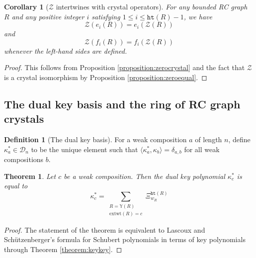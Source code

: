 \documentclass{amsart}
\newtheorem{corollary}[lemma]{Corollary}
\newtheorem{theorem}{Theorem}[section]
\theoremstyle{definition}
\newtheorem{definition}[lemma]{Definition}
\theoremstyle{remark}
\numberwithin{equation}{subsection}
\newcommand{\wof}[1]{w_{#1}}
\newcommand{\zeromap}{\mathcal{Z}}
\newcommand{\hr}{\mathtt{ht}}
\newcommand{\RC}{\mathcal{RC}}
\newcommand{\lzeromap}{\mathscr{Z}}
\newcommand{\dsch}{\ensuremath{\Xi}}
\newcommand{\dcoma}{\mathcal{D}}
\begin{document}
\begin{corollary}[$\zeromap$ intertwines with crystal operators] \label{corollary:crystaliso}
For any bounded RC graph $R$ and any positive integer $i$ satisfying $1\leq i\leq \hr(R) - 1$, we have 
$$\zeromap(e_i(R)) = e_i(\zeromap(R))$$
and
$$\zeromap(f_i(R)) = f_i(\zeromap(R))$$
whenever the left-hand sides are defined.
\end{corollary}
\begin{proof}
This follows from Proposition \ref{proposition:zerocrystal} and the fact that $\lzeromap$ is a crystal isomorphism by Proposition \ref{proposition:zeroequal}.
\end{proof}

\subsection{The dual key basis and the ring of RC graph crystals}

\begin{definition}[The dual key basis]
  For a weak composition $a$ of length $n$, define $\kappa_a^*\in \dcoma_n$ to be the unique element such that $\langle \kappa_a^*, \kappa_b\rangle = \delta_{a,b}$ for all weak compositions $b$.
\end{definition}






\begin{theorem} \label{theorem:keyformula}
  Let $c$ be a weak composition. Then the dual key polynomial $\kappa^*_c$ is equal to
$$\kappa^*_c = \sum_{\substack{R=\mathbb{Y}(R)\\ \mathrm{extwt}(R)=c}} \dsch_{\wof{R}}^{\hr(R)}$$
\end{theorem}
\begin{proof}
  The statement of the theorem is equivalent to Lascoux and Sch\"utzenberger's formula for Schubert polynomials in terms of key polynomials through Theorem \ref{theorem:keykey}.
\end{proof}
\end{document}
